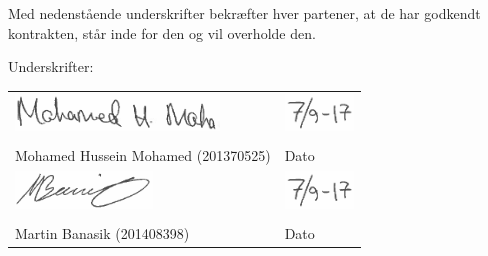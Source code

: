 \documentclass[main.tex]{subfiles}
\begin{document}
\newpage
Med nedenstående underskrifter bekræfter hver partener, at de har godkendt kontrakten, står inde for den og vil overholde den. 
 
Underskrifter:

\begin{vplace}[0.1]

\noindent \begin{tabular}{ll}
\includegraphics[height=1cm]{Figure/underskriftmohamed} & \includegraphics[height=1cm]{Figure/underskriftdato}\\
	\makebox[3in]{\hrulefill} & \makebox[1.5in]{\hrulefill}\\
	Mohamed Hussein Mohamed  (201370525) & Dato\\[9ex]
    \includegraphics[height=1cm]{Figure/underskriftmartin} & \includegraphics[height=1cm]{Figure/underskriftdato} \\
	\makebox[3in]{\hrulefill} & \makebox[1.5in]{\hrulefill}\\
	Martin Banasik  (201408398) & Dato\\[7ex]
		
\end{tabular}

\end{vplace}
\end{document}
